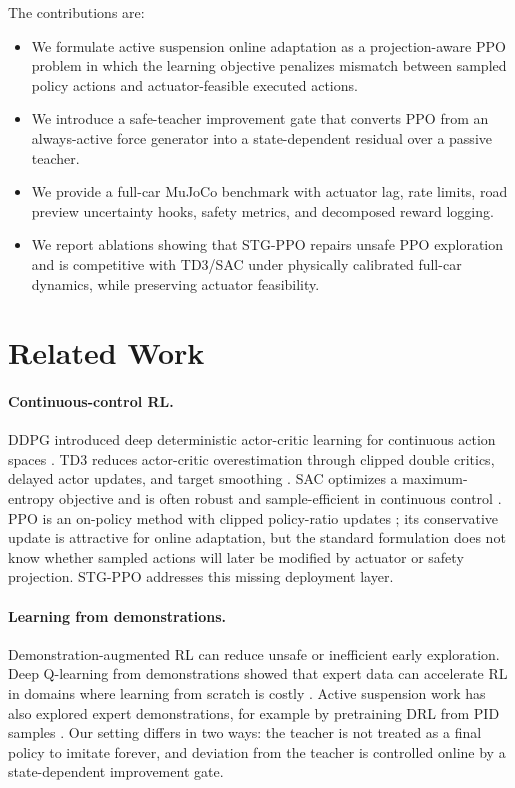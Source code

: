 \documentclass[letterpaper,twocolumn]{article}
\begin{document}
The contributions are:
\begin{itemize}
    \item We formulate active suspension online adaptation as a projection-aware PPO problem in which the learning objective penalizes mismatch between sampled policy actions and actuator-feasible executed actions.
    \item We introduce a safe-teacher improvement gate that converts PPO from an always-active force generator into a state-dependent residual over a passive teacher.
    \item We provide a full-car MuJoCo benchmark with actuator lag, rate limits, road preview uncertainty hooks, safety metrics, and decomposed reward logging.
    \item We report ablations showing that STG-PPO repairs unsafe PPO exploration and is competitive with TD3/SAC under physically calibrated full-car dynamics, while preserving actuator feasibility.
\end{itemize}

\section{Related Work}

\paragraph{Continuous-control RL.}
DDPG introduced deep deterministic actor-critic learning for continuous action spaces \citep{lillicrap2015ddpg}.
TD3 reduces actor-critic overestimation through clipped double critics, delayed actor updates, and target smoothing \citep{fujimoto2018td3}.
SAC optimizes a maximum-entropy objective and is often robust and sample-efficient in continuous control \citep{haarnoja2018sac}.
PPO is an on-policy method with clipped policy-ratio updates \citep{schulman2017ppo}; its conservative update is attractive for online adaptation, but the standard formulation does not know whether sampled actions will later be modified by actuator or safety projection.
STG-PPO addresses this missing deployment layer.

\paragraph{Learning from demonstrations.}
Demonstration-augmented RL can reduce unsafe or inefficient early exploration.
Deep Q-learning from demonstrations showed that expert data can accelerate RL in domains where learning from scratch is costly \citep{hester2018dqfd}.
Active suspension work has also explored expert demonstrations, for example by pretraining DRL from PID samples \citep{tan2024active_demo}.
Our setting differs in two ways: the teacher is not treated as a final policy to imitate forever, and deviation from the teacher is controlled online by a state-dependent improvement gate.
\end{document}
